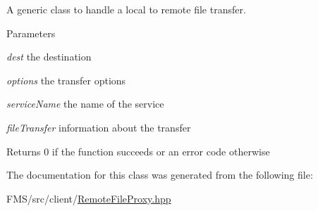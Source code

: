 A generic class to handle a local to remote file transfer. 


\begin{DoxyParams}{Parameters}
\item[{\em dest}]the destination \item[{\em options}]the transfer options \item[{\em serviceName}]the name of the service \item[{\em fileTransfer}]information about the transfer \end{DoxyParams}
\begin{DoxyReturn}{Returns}
0 if the function succeeds or an error code otherwise 
\end{DoxyReturn}


The documentation for this class was generated from the following file:\begin{DoxyCompactItemize}
\item 
FMS/src/client/\hyperlink{RemoteFileProxy_8hpp}{RemoteFileProxy.hpp}\end{DoxyCompactItemize}
